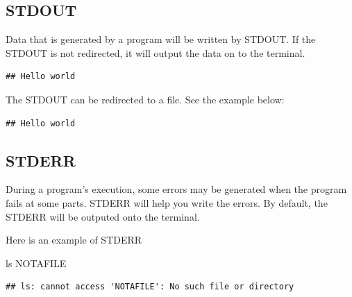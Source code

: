\documentclass[]{book}
\makeatletter
\newenvironment{Shaded}{\begin{snugshade}}{\end{snugshade}}
\newcommand{\BuiltInTok}[1]{#1}
\newcommand{\CommentTok}[1]{\textcolor[rgb]{0.56,0.35,0.01}{\textit{#1}}}
\newcommand{\FunctionTok}[1]{\textcolor[rgb]{0.00,0.00,0.00}{#1}}
\newcommand{\NormalTok}[1]{#1}
\newcommand{\OperatorTok}[1]{\textcolor[rgb]{0.81,0.36,0.00}{\textbf{#1}}}
\newcommand{\StringTok}[1]{\textcolor[rgb]{0.31,0.60,0.02}{#1}}
\newcommand{\VariableTok}[1]{\textcolor[rgb]{0.00,0.00,0.00}{#1}}
\newenvironment{kframe}{%
\medskip{}
\setlength{\fboxsep}{.8em}
 \def\at@end@of@kframe{}%
 \ifinner\ifhmode%
  \def\at@end@of@kframe{\end{minipage}}%
  \begin{minipage}{\columnwidth}%
 \fi\fi%
 \def\FrameCommand##1{\hskip\@totalleftmargin \hskip-\fboxsep
 \colorbox{shadecolor}{##1}\hskip-\fboxsep
     \hskip-\linewidth \hskip-\@totalleftmargin \hskip\columnwidth}%
 \MakeFramed {\advance\hsize-\width
   \@totalleftmargin\z@ \linewidth\hsize
   \@setminipage}}%
 {\par\unskip\endMakeFramed%
 \at@end@of@kframe}
\renewenvironment{Shaded}{\begin{kframe}}{\end{kframe}}
\makeatother
\begin{document}
\hypertarget{stdout}{%
\subsection{STDOUT}\label{stdout}}

Data that is generated by a program will be written by STDOUT. If the STDOUT is not redirected, it will output the data on to the terminal.

\begin{Shaded}
\end{Shaded}

\begin{verbatim}
## Hello world
\end{verbatim}

The STDOUT can be redirected to a file. See the example below:

\begin{Shaded}
\end{Shaded}

\begin{verbatim}
## Hello world
\end{verbatim}

\hypertarget{stderr}{%
\subsection{STDERR}\label{stderr}}

During a program's execution, some errors may be generated when the program fails at some parts. STDERR will help you write the errors. By default, the STDERR will be outputed onto the terminal.

Here is an example of STDERR

\begin{Shaded}
\begin{Highlighting}[]
\FunctionTok{ls}\NormalTok{ NOTAFILE}
\end{Highlighting}
\end{Shaded}

\begin{verbatim}
## ls: cannot access 'NOTAFILE': No such file or directory
\end{verbatim}
\end{document}
